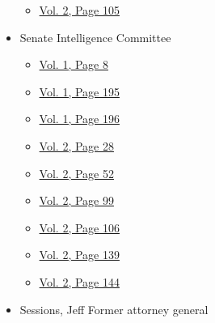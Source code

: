 \begin{itemize}
  \begin{itemize}
  \tightlist
  \item
    \protect\hyperlink{g-page-317}{Vol. 2, Page 105}
  \end{itemize}
\item
  Senate Intelligence Committee

  \begin{itemize}
  \tightlist
  \item
    \protect\hyperlink{g-page-16}{Vol. 1, Page 8}
  \item
    \protect\hyperlink{g-page-203}{Vol. 1, Page 195}
  \item
    \protect\hyperlink{g-page-204}{Vol. 1, Page 196}
  \item
    \protect\hyperlink{g-page-240}{Vol. 2, Page 28}
  \item
    \protect\hyperlink{g-page-264}{Vol. 2, Page 52}
  \item
    \protect\hyperlink{g-page-311}{Vol. 2, Page 99}
  \item
    \protect\hyperlink{g-page-318}{Vol. 2, Page 106}
  \item
    \protect\hyperlink{g-page-351}{Vol. 2, Page 139}
  \item
    \protect\hyperlink{g-page-356}{Vol. 2, Page 144}
  \end{itemize}
\item
  Sessions, Jeff Former attorney general


\end{itemize}
